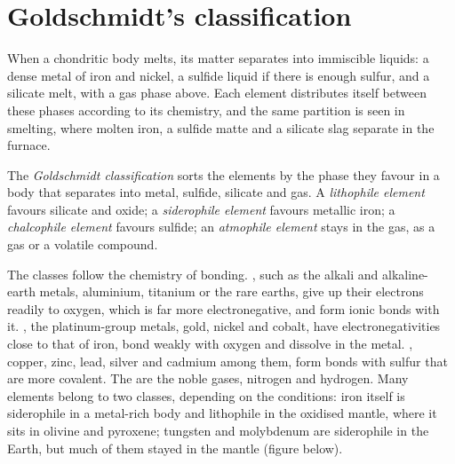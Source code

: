 \section{Goldschmidt's classification}

When a chondritic body melts, its matter separates into immiscible liquids: a
dense metal of iron and nickel, a sulfide liquid if there is enough sulfur, and a
silicate melt, with a gas phase above. Each element distributes itself between
these phases according to its chemistry, and the same partition is seen in
smelting, where molten iron, a sulfide matte and a silicate slag separate in the
furnace.

\begin{definition}
\label{def:b2:elements-in-the-earth:goldschmidt}
The \emph{Goldschmidt classification} sorts
the elements by the phase they favour in a body that separates into metal,
sulfide, silicate and gas. A \emph{lithophile element}
favours silicate and oxide; a \emph{siderophile element} favours metallic iron; a \emph{chalcophile
element} favours sulfide; an \emph{atmophile
element} stays in the gas, as a gas or a volatile
compound.
\end{definition}

The classes follow the chemistry of bonding. , such as the
alkali and alkaline-earth metals, aluminium, titanium or the rare earths, give
up their electrons readily to oxygen, which is far more electronegative, and
form ionic bonds with it. , the platinum-group metals, gold,
nickel and cobalt, have electronegativities close to that of iron, bond weakly
with oxygen and dissolve in the metal. , copper, zinc, lead,
silver and cadmium among them, form bonds with sulfur that are more covalent.
The  are the noble gases, nitrogen and hydrogen. Many
elements belong to two classes, depending on the conditions: iron itself is
siderophile in a metal-rich body and lithophile in the oxidised mantle, where it
sits in olivine and pyroxene; tungsten and molybdenum are siderophile in the
Earth, but much of them stayed in the mantle (figure below).

